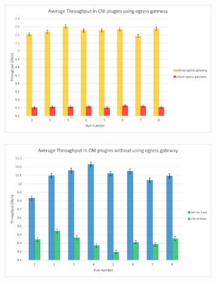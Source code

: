 \begin{figure}[H]
    \centering
    \begin{subfigure}[b]{0.45\textwidth}
        \includegraphics[width=\textwidth]{plots/small/throughput_egress.png}
        \caption{}
        \label{fig:throughput_a}
    \end{subfigure}
    \hfill
    \begin{subfigure}[b]{0.45\textwidth}
        \includegraphics[width=\textwidth]{plots/small/throughput_base.png}
        \caption{}
        \label{fig:throughput_b}
    \end{subfigure}
    
    \vspace{10pt}
    

\end{figure}
